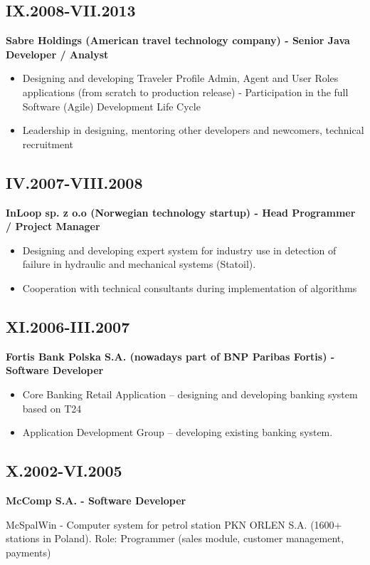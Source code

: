 \documentclass[11pt,a4paper]{article}
\begin{document}
\subsection*{IX.2008-VII.2013}
\textbf{Sabre Holdings (American travel technology company) - Senior Java Developer / Analyst}
\begin{itemize}
    \item Designing and developing Traveler Profile Admin, Agent and User Roles applications (from scratch to production release) - Participation in the full Software (Agile) Development Life Cycle
    \item Leadership in designing, mentoring other developers and newcomers, technical recruitment
\end{itemize}

\newpage

\subsection*{IV.2007-VIII.2008}
\textbf{InLoop sp. z o.o (Norwegian technology startup) - Head Programmer / Project Manager}
\begin{itemize}
    \item Designing and developing expert system for industry use in detection of failure in hydraulic and mechanical systems (Statoil).
    \item Cooperation with technical consultants during implementation of algorithms
\end{itemize}

\subsection*{XI.2006-III.2007}
\textbf{Fortis Bank Polska S.A. (nowadays part of BNP Paribas Fortis) - Software Developer}
\begin{itemize}
    \item Core Banking Retail Application -- designing and developing banking system based on T24
    \item Application Development Group -- developing existing banking system.
\end{itemize}

\subsection*{X.2002-VI.2005}
\textbf{McComp S.A. - Software Developer}

McSpalWin - Computer system for petrol station PKN ORLEN S.A. (1600+ stations in Poland). Role: Programmer (sales module, customer management, payments)
\end{document}
